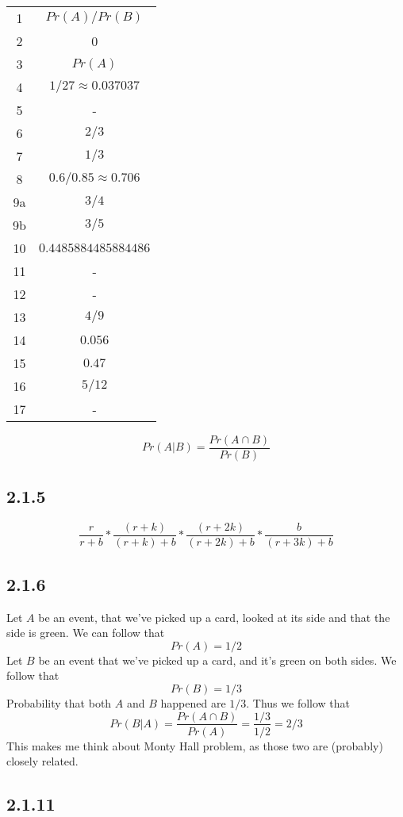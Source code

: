 \documentclass[11pt,oneside,titlepage]{book}
\begin{document}
\begin{tabular}[center]{||c | c|| }
  \hline
  1 & $Pr(A) / Pr(B)$ \\
  2 & 0 \\
  3 & $Pr(A)$ \\
  4 & $1/27 \approx 0.037037$ \\
  5 & - \\
  6 & $2/3$ \\
  7 & $1/3$ \\
  8 & $0.6 / 0.85 \approx 0.706$ \\
  9a & $3/4$ \\
  9b & $3/5$ \\
  10 & $0.4485884485884486$ \\
  11 & - \\
  12 & - \\
  13 & $4/9$ \\
  14 & $0.056$ \\
  15 & $0.47$ \\
  16 & $5/12$ \\
  17 & - \\
  \hline 
\end{tabular}

$$Pr(A|B) = \frac{Pr(A \cap B)}{Pr(B)}$$

\subsection*{2.1.5}

$$\frac{r}{r + b} *  \frac{(r + k)}{(r + k) + b} * \frac{(r + 2k)}{(r + 2k) + b} *
\frac{b}{(r + 3k) + b} $$

\subsection*{2.1.6}

Let $A$ be an event, that we've picked up a card, looked at its side and that the side is green.
We can follow that
$$Pr(A) = 1/2$$
Let $B$ be an event that we've picked up a card, and it's green on both sides. We follow that
$$Pr(B) = 1/3$$
Probability that both $A$ and $B$ happened are $1/3$. Thus we follow that 
$$Pr(B | A) = \frac{Pr(A \cap B)}{Pr(A)} = \frac{1/3}{1/2} = 2/3$$
This makes me think about Monty Hall problem, as those two are (probably) closely related.

\subsection*{2.1.11}
\end{document}
